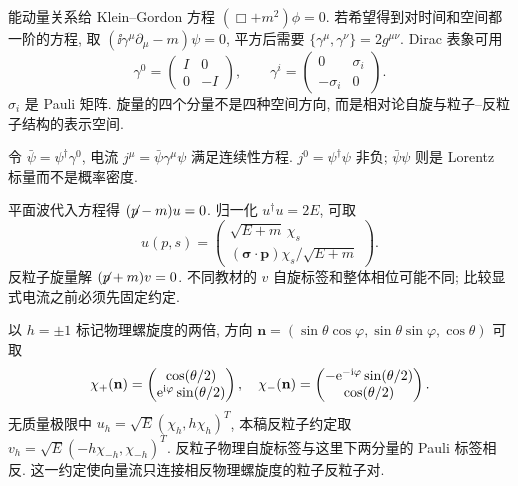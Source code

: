 \label{ch:spinor}
能动量关系给 Klein--Gordon 方程 $(\Box+m^2)\phi=0$. 若希望得到对时间和空间都一阶的方程, 取 $(\ii\gamma^\mu\partial_\mu-m)\psi=0$, 平方后需要 $\{\gamma^\mu,\gamma^\nu\}=2g^{\mu\nu}$. Dirac 表象可用
\begin{equation}
 \gamma^0=\begin{pmatrix}I&0\\0&-I\end{pmatrix},\qquad
 \gamma^i=\begin{pmatrix}0&\sigma_i\\-\sigma_i&0\end{pmatrix}.
\end{equation}
$\sigma_i$ 是 Pauli 矩阵. 旋量的四个分量不是四种空间方向, 而是相对论自旋与粒子--反粒子结构的表示空间.

令 $\bar\psi=\psi^\dagger\gamma^0$, 电流 $j^\mu=\bar\psi\gamma^\mu\psi$ 满足连续性方程. $j^0=\psi^\dagger\psi$ 非负; $\bar\psi\psi$ 则是 Lorentz 标量而不是概率密度.

平面波代入方程得 $(\slashed p-m)u=0$. 归一化 $u^\dagger u=2E$, 可取
\begin{equation}
 u(p,s)=\begin{pmatrix}\sqrt{E+m}\,\chi_s\\(\boldsymbol\sigma\cdot\mathbf p)\chi_s/\sqrt{E+m}\end{pmatrix}.
\end{equation}
反粒子旋量解 $(\slashed p+m)v=0$. 不同教材的 $v$ 自旋标签和整体相位可能不同; 比较显式电流之前必须先固定约定.

以 $h=\pm1$ 标记物理螺旋度的两倍, 方向 $\mathbf n=(\sin\theta\cos\varphi,\sin\theta\sin\varphi,\cos\theta)$ 可取
\begin{equation}
 \chi_+(\mathbf n)=\begin{pmatrix}\cos(\theta/2)\\\e^{\ii\varphi}\sin(\theta/2)\end{pmatrix},\quad
 \chi_-(\mathbf n)=\begin{pmatrix}-\e^{-\ii\varphi}\sin(\theta/2)\\\cos(\theta/2)\end{pmatrix}.
\end{equation}
无质量极限中 $u_h=\sqrt E(\chi_h,h\chi_h)^T$, 本稿反粒子约定取 $v_h=\sqrt E(-h\chi_{-h},\chi_{-h})^T$. 反粒子物理自旋标签与这里下两分量的 Pauli 标签相反. 这一约定使向量流只连接相反物理螺旋度的粒子反粒子对.

